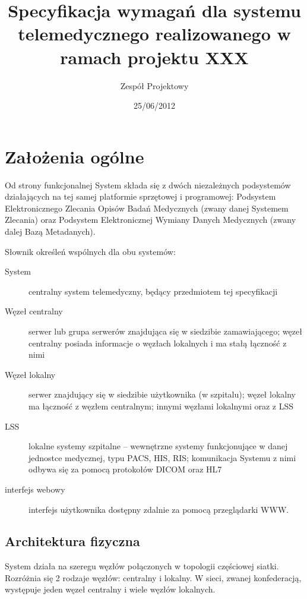 \documentclass[a4paper]{report}
\begin{document}
\title{Specyfikacja wymagań dla systemu telemedycznego realizowanego w ramach projektu XXX}
\author{Zespół Projektowy}
\date{25/06/2012}
\maketitle

\tableofcontents

\chapter{Założenia ogólne}

Od strony funkcjonalnej System składa się z dwóch niezależnych podsystemów działających na tej samej platformie sprzętowej i programowej: Podsystem Elektronicznego Zlecania Opisów Badań Medycznych (zwany danej Systemem Zlecania) oraz Podsystem Elektronicznej Wymiany Danych Medycznych (zwany dalej Bazą Metadanych).

Słownik określeń wspólnych dla obu systemów:
\begin{description}
\item[System] centralny system telemedyczny, będący przedmiotem tej specyfikacji
\item[Węzeł centralny] serwer lub grupa serwerów znajdująca się w siedzibie zamawiającego; węzeł centralny posiada informacje o węzłach lokalnych i ma stałą łączność z nimi
\item[Węzeł lokalny] serwer znajdujący się w siedzibie użytkownika (w szpitalu); węzeł lokalny ma łączność z węzłem centralnym; innymi węzłami lokalnymi oraz z LSS
\item[LSS] lokalne systemy szpitalne -- wewnętrzne systemy funkcjonujące w danej jednostce medycznej, typu PACS, HIS, RIS; komunikacja Systemu z nimi odbywa się za pomocą protokołów DICOM oraz HL7
\item[interfejs webowy] interfejs użytkownika dostępny zdalnie za pomocą przeglądarki WWW.
\end{description}

\section{Architektura fizyczna}
\label{sec:arch_fiz}

System działa na szeregu węzłów połączonych w topologii częściowej siatki. Rozróżnia się 2 rodzaje węzłów: centralny i lokalny. W sieci, zwanej konfederacją, występuje jeden węzeł centralny i wiele węzłów lokalnych. 
\end{document}
